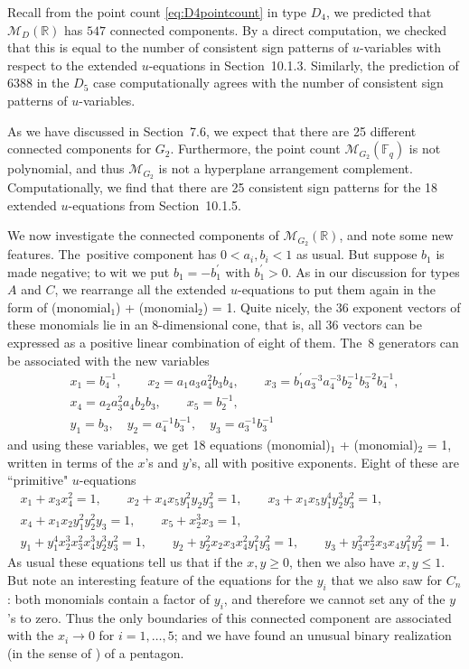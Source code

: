 \documentclass[pdftex]{sigma}%
\def\R{{\mathbb R}}
\def\F{{\mathbb F}}
\def\M{{\mathcal{M}}}
\numberwithin{equation}{section}
\begin{document}
Recall from the point count \eqref{eq:D4pointcount} in type $D_4$, we predicted that $\M_D(\R)$ has $547$ connected components. By a direct computation, we checked that this is equal to the number of consistent sign patterns of $u$-variables with respect to the extended $u$-equations in Section~10.1.3. Similarly, the prediction of $6388$ in the $D_5$ case computationally agrees with the number of consistent sign patterns of $u$-variables.

\bigskip{}
As we have discussed in Section~7.6, we expect that there are 25 different connected components for $G_2$. Furthermore, the point count $\M_{G_2}(\F_q)$ is not polynomial, and thus $\M_{G_2}$ is not a hyperplane arrangement complement. Computationally, we find that there are 25 consistent sign patterns for the 18 extended $u$-equations from Section~10.1.5.

We now investigate the connected components of $\M_{G_2}(\R)$, and note some new features. The~positive component has $0 < a_i, b_i < 1$ as usual. But suppose $b_1$ is made negative; to wit we put $b_1 = -b^\prime_1$ with $b^\prime_1 > 0$. As in our discussion for types $A$ and $C$, we rearrange all the extended $u$-equations to put them again in the form of (monomial$_1$) + (monomial$_2$) = 1. Quite nicely, the 36 exponent vectors of these monomials lie in an 8-dimensional cone, that is, all 36 vectors can be expressed as a positive linear combination of eight of them. The~8 generators can be associated with the new variables
\begin{gather*}
x_1 = b_4^{-1},\qquad x_2=a_1a_3 a_4^2 b_3 b_4,\qquad x_3 = b^\prime_1 a_3^{-3} a_4^{-3} b_2^{-1} b_3^{-2} b_4^{-1},
\\
x_4=a_2 a_3^2 a_4 b_2 b_3,\qquad x_5 =b_2^{-1},
\\
y_1=b_3, \quad
 y_2= a_4^{-1} b_3^{-1}, \quad y_3=a_3^{-1} b_3^{-1}
\end{gather*}
and using these variables, we get 18 equations (monomial)$_1$ + (monomial)$_2$ = 1, written in terms of the $x$'s and $y$'s, all with positive exponents. Eight of these are ``primitive" $u$-equations
\begin{gather*}
x_1 + x_3 x_4^2=1, \qquad
x_2 + x_4 x_5 y_1^2 y_2 y_3^2=1, \qquad
x_3 + x_1 x_5 y_1^4 y_2^3 y_3^2=1,
\\
x_4 + x_1 x_2 y_1^2 y_2^2 y_3=1, \qquad
x_5 + x_2^3 x_3=1,
\\[.5ex]
y_1 + y_1^4 x_2^3 x_3^2 x_4^3 y_2^3 y_3^2=1, \qquad
y_2 + y_2^2 x_2 x_3 x_4^2 y_1^2 y_3^2=1, \qquad
y_3 + y_3^2 x_2^2 x_3 x_4 y_1^2 y_2^2=1.
\end{gather*}
 As usual these equations tell us that if the $x,y \geq 0$, then we also have $x, y \leq 1$. But note an interesting feature of the equations for the $y_i$ that we also saw for $C_n$: both monomials contain a factor of $y_i$, and therefore we cannot set any of the $y$'s to zero. Thus the only boundaries of this connected component are associated with the $x_{i} \to 0$ for $i =1,\dots,5$; and we have found an unusual binary realization (in the sense of \cite{AHLT}) of a pentagon.
\end{document}

